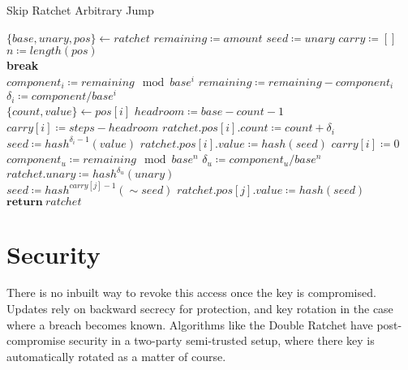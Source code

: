 \documentclass[twocolumn]{article}
\begin{document}
	\begin{algorithm*}
		\caption{Skip Ratchet Arbitrary Jump}
		\label{alg:jump}
		
		\begin{algorithmic}[1]
				\State $\{base, unary, pos\} \gets ratchet$
				\State $remaining \coloneqq amount$
				\State $seed \coloneqq unary$
				\State $carry \coloneqq []$
				\State $n \coloneqq length(pos)$
				\\
						\State \textbf{break}
					\EndIf
					\\
					\State $component_{i} \coloneqq remaining\mod{base^{i}}$
					\State $remaining \coloneqq remaining - component_{i}$
					\State $\delta_{i} \coloneqq component / base^{i}$ 
					\\
					\State $\{count, value\} \gets pos[i]$
					\State $headroom \coloneqq base - count - 1$
					\\
						\State $carry[i] \coloneqq steps - headroom$
					\Else
						\State $ratchet.pos[i].count \coloneqq count + \delta_{i}$
							\State $seed \coloneqq hash^{\delta_{i} - 	1}(value)$
							\State $ratchet.pos[i].value \coloneqq hash(seed)$
						\Else
							\State $carry[i] \coloneqq 0$
						\EndIf
					\EndIf
				\EndFor
				\\
					\State $component_{u} \coloneqq remaining \mod{base^{n}}$
					\State $\delta_{u} \coloneqq component_{u} / base^{n}$
					\State $ratchet.unary \coloneqq hash^{\delta_{u}}(unary)$
				\EndIf
				\\
				 
					\State $seed \coloneqq hash^{carry[j] - 1}(\sim{seed})$
					\State $ratchet.pos[j].value \coloneqq hash(seed)$
				\EndFor
				\\
				\State $\textbf{return}\ ratchet$
			\EndFunction
		\end{algorithmic}
	\end{algorithm*}

	\section{Security}
	
	There is no inbuilt way to revoke this access once the key is compromised. Updates rely on backward secrecy for protection, and key rotation in the case where a breach becomes known. Algorithms like the Double Ratchet\cite{double-ratchet} have post-compromise security in a two-party semi-trusted setup, where there key is automatically rotated as a matter of course.
		
\end{document}
